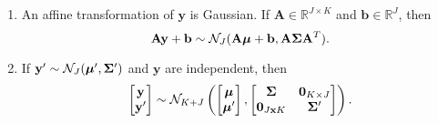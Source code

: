\begin{theorem}
\begin{enumerate}
        \item
            An affine transformation of $\mathbf{y}$ is Gaussian.
            If $\mathbf{A} \in \mathbb{R}^{J \times K}$ and $\mathbf{b} \in \mathbb{R}^{J}$, then
            \begin{equation*}
                \mathbf{Ay} + \mathbf{b} \sim \mathcal{N}_J(
                \mathbf{A} \boldsymbol{\mu} + \mathbf{b},
                \mathbf{A} \boldsymbol{\Sigma} \mathbf{A}^{T}
                ).
            \end{equation*}

        \item
            If $\mathbf{y}' \sim \mathcal{N}_J( \boldsymbol{\mu}', \boldsymbol{\Sigma}')$ and $\mathbf{y}$ are independent, then
            \begin{equation*}
                \begin{bmatrix}
                    \mathbf{y} \\
                    \mathbf{y}'
                \end{bmatrix}
                \sim \mathcal{N}_{K + J} \left(
                \begin{bmatrix}
                        \boldsymbol{\mu} \\
                        \boldsymbol{\mu}'
                    \end{bmatrix}
                ,
                \begin{bmatrix}
                        \boldsymbol{\Sigma} & \mathbf{0}_{K \times J} \\
                        \mathbf{0}_{J \mathbf{x}
                        K} & \boldsymbol{\Sigma}'
                    \end{bmatrix}
                \right).
            \end{equation*}
    \end{enumerate}
\end{theorem}
